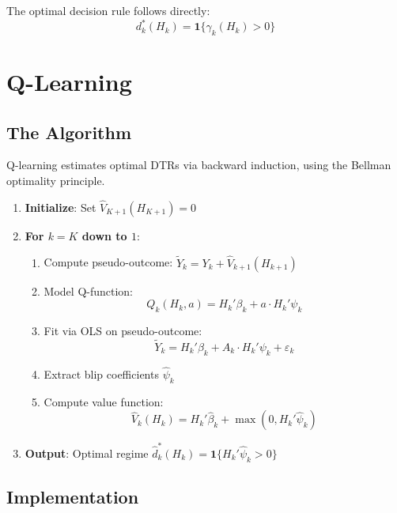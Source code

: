 The optimal decision rule follows directly:
\begin{equation}
d^*_k(H_k) = \mathbf{1}\{\gamma_k(H_k) > 0\}
\end{equation}


\section{Q-Learning}

\subsection{The Algorithm}

Q-learning estimates optimal DTRs via backward induction, using the Bellman optimality principle.

\begin{algorithm}[Q-Learning]
\label{alg:q-learning}
\begin{enumerate}
\item \textbf{Initialize}: Set $\hat{V}_{K+1}(H_{K+1}) = 0$
\item \textbf{For $k = K$ down to $1$}:
\begin{enumerate}
\item Compute pseudo-outcome: $\tilde{Y}_k = Y_k + \hat{V}_{k+1}(H_{k+1})$
\item Model Q-function:
\begin{equation}
Q_k(H_k, a) = H_k'\beta_k + a \cdot H_k'\psi_k
\end{equation}
\item Fit via OLS on pseudo-outcome:
\begin{equation}
\tilde{Y}_k = H_k'\beta_k + A_k \cdot H_k'\psi_k + \varepsilon_k
\end{equation}
\item Extract blip coefficients $\hat{\psi}_k$
\item Compute value function:
\begin{equation}
\hat{V}_k(H_k) = H_k'\hat{\beta}_k + \max(0, H_k'\hat{\psi}_k)
\end{equation}
\end{enumerate}
\item \textbf{Output}: Optimal regime $\hat{d}^*_k(H_k) = \mathbf{1}\{H_k'\hat{\psi}_k > 0\}$
\end{enumerate}
\end{algorithm}

\subsection{Implementation}

